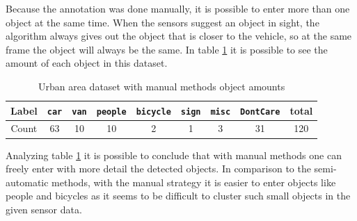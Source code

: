Because the annotation was done manually, it is possible to enter more than one object at the same time. When the sensors suggest an object in sight, the algorithm always gives out the object that is closer to the vehicle, so at the same frame the object will always be the same. In table \ref{tab: urban2stats} it is possible to see the amount of each object in this dataset.

\begin{table}[]
	\centering
	\caption{Urban area dataset with manual methods object amounts}
	\label{tab: urban2stats}
	\begin{tabular}{c|c|c|c|c|c|c|c|c}
		\textbf{Label} & \texttt{car} & \texttt{van} & \texttt{people} & \texttt{bicycle} & \texttt{sign} & \texttt{misc} & \texttt{DontCare} & \textbf{total} \\ \hline
		Count          & 63           & 10            & 10               & 2                & 1             & 3             & 31                & 120           
	\end{tabular}
\end{table}

Analyzing table \ref{tab: urban2stats} it is possible to conclude that with manual methods one can freely enter with more detail the detected objects. In comparison to the semi-automatic methods, with the manual strategy it is easier to enter objects like people and bicycles as it seems to be difficult to cluster such small objects in the given sensor data.











